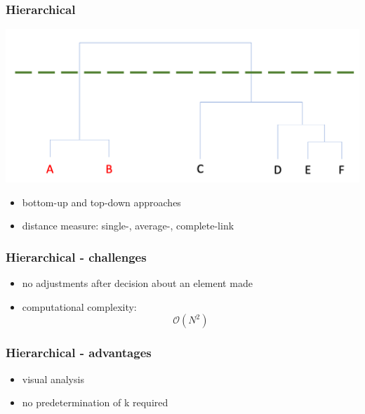 \documentclass[11pt]{article}
\begin{document}
\subsubsection*{Hierarchical}
\label{sec:orgbb9e7a4}
\begin{center}
\includegraphics[width=.9\linewidth]{./img/dendogram.png}
\end{center}
\begin{itemize}
\item bottom-up and top-down approaches
\item distance measure: single-, average-, complete-link
\end{itemize}
\subsubsection*{Hierarchical - challenges}
\label{sec:orgca9d899}
\begin{itemize}
\item no adjustments after decision about an element made
\item computational complexity: $$ \mathcal{O}(N^2) $$
\end{itemize}
\subsubsection*{Hierarchical - advantages}
\label{sec:orgd7db302}
\begin{itemize}
\item visual analysis
\item no predetermination of k required
\end{itemize}
\end{document}
